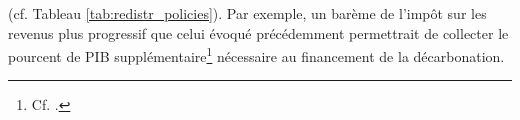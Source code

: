 \documentclass[a5paper,french,openany]{memoir}
\begin{document}
{%
} (cf. Tableau \ref{tab:redistr_policies}). 
Par exemple, un barème de l'impôt sur les revenus %
plus progressif que celui évoqué précédemment permettrait de collecter le pourcent de PIB supplémentaire\footnote{Cf. \cite{aie_net_2021}.} nécessaire au financement de la décarbonation. 
\end{document}
